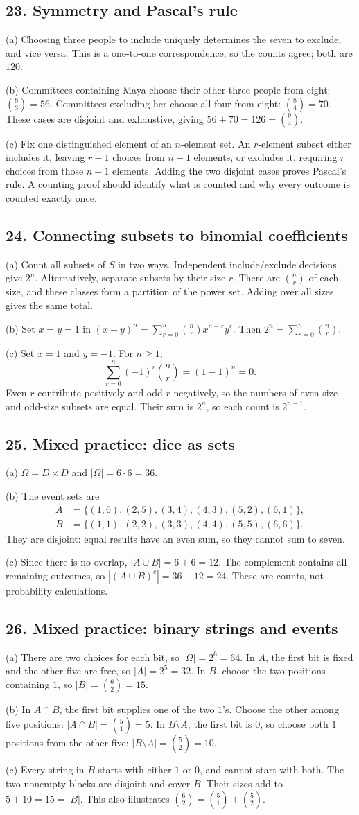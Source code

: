 \documentclass[11pt,letterpaper]{article}
\newcommand{\answer}[2]{\Needspace{2in}\subsection*{#1}#2}
\begin{document}
\answer{23. Symmetry and Pascal's rule}{(a) Choosing three people to include uniquely determines the seven to exclude, and vice versa. This is a one-to-one correspondence, so the counts agree; both are $120$.

(b) Committees containing Maya choose their other three people from eight: $\binom83=56$. Committees excluding her choose all four from eight: $\binom84=70$. These cases are disjoint and exhaustive, giving $56+70=\boxed{126}=\binom94$.

(c) Fix one distinguished element of an $n$-element set. An $r$-element subset either includes it, leaving $r-1$ choices from $n-1$ elements, or excludes it, requiring $r$ choices from those $n-1$ elements. Adding the two disjoint cases proves Pascal's rule. A counting proof should identify what is counted and why every outcome is counted exactly once.}

\answer{24. Connecting subsets to binomial coefficients}{(a) Count all subsets of $S$ in two ways. Independent include/exclude decisions give $2^n$. Alternatively, separate subsets by their size $r$. There are $\binom nr$ of each size, and these classes form a partition of the power set. Adding over all sizes gives the same total.

(b) Set $x=y=1$ in $(x+y)^n=\sum_{r=0}^n\binom nr x^{n-r}y^r$. Then $2^n=\sum_{r=0}^n\binom nr$.

(c) Set $x=1$ and $y=-1$. For $n\ge1$,
\[
\sum_{r=0}^n(-1)^r\binom nr=(1-1)^n=\boxed{0}.
\]
Even $r$ contribute positively and odd $r$ negatively, so the numbers of even-size and odd-size subsets are equal. Their sum is $2^n$, so each count is $2^{n-1}$.}

\answer{25. Mixed practice: dice as sets}{(a) $\Omega=D\times D$ and $|\Omega|=6\cdot6=\boxed{36}$.

(b) The event sets are
\begin{align*}
A&=\{(1,6),(2,5),(3,4),(4,3),(5,2),(6,1)\},\\
B&=\{(1,1),(2,2),(3,3),(4,4),(5,5),(6,6)\}.
\end{align*}
They are disjoint: equal results have an even sum, so they cannot sum to seven.

(c) Since there is no overlap, $|A\cup B|=6+6=\boxed{12}$. The complement contains all remaining outcomes, so $|(A\cup B)^c|=36-12=\boxed{24}$. These are counts, not probability calculations.}

\answer{26. Mixed practice: binary strings and events}{(a) There are two choices for each bit, so $|\Omega|=2^6=64$. In $A$, the first bit is fixed and the other five are free, so $|A|=2^5=32$. In $B$, choose the two positions containing $1$, so $|B|=\binom62=15$.

(b) In $A\cap B$, the first bit supplies one of the two $1$'s. Choose the other among five positions: $|A\cap B|=\binom51=\boxed{5}$. In $B\setminus A$, the first bit is $0$, so choose both $1$ positions from the other five: $|B\setminus A|=\binom52=\boxed{10}$.

(c) Every string in $B$ starts with either $1$ or $0$, and cannot start with both. The two nonempty blocks are disjoint and cover $B$. Their sizes add to $5+10=15=|B|$. This also illustrates $\binom62=\binom51+\binom52$.}
\end{document}

